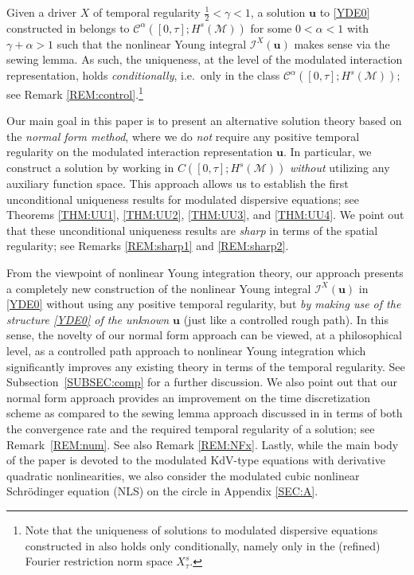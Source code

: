 \documentclass[letterpaper, 11pt,  reqno]{amsart}
\newcommand{\1}{\hspace{0.5mm}\text{I}\hspace{0.5mm}}
\newcommand{\I}{\mathcal{I}}
\newcommand{\CC}{\mathcal{C}}
\newcommand{\al}{\alpha}
\newcommand{\g}{\gamma}
\newcommand{\M}{\mathcal{M}}
\newcommand{\uu}{\mathbf{u}}
\numberwithin{equation}{section}
\numberwithin{theorem}{section}
\begin{document}
Given a driver $X$ of temporal regularity $\frac 12 < \g < 1$, 
a solution $\uu$ to \eqref{YDE0} constructed in \cite{CG1, CGLLO1}
belongs to $\CC^\al([0, \tau] ; H^s(\M))$
for some $0 < \al < 1$ with $\g + \al > 1$
such that the nonlinear Young integral $\I^X(\uu)$
makes sense via the sewing lemma.
As such, 
 the uniqueness, at the level of the modulated interaction representation,  holds 
 {\it conditionally}, i.e.~only  in the class 
 $\CC^\al([0, \tau]; H^s(\M))$;
 see Remark \ref{REM:control}.\footnote{\label{FT:3}Note that the uniqueness
 of solutions to modulated dispersive equations
 constructed 
in \cite{Robert2, Robert3, Robert4}
also holds only conditionally, 
namely only in 
 the  (refined) Fourier restriction norm space $X^s_\tau $.}
 




Our main goal in this paper is to present
an alternative solution theory based
on the {\it normal form method}, 
where we do {\it not} require any positive  temporal regularity on
the modulated interaction representation $\uu$.
In particular, we construct a solution 
by working  in $C([0, \tau]; H^s(\M))$
{\it without} utilizing any auxiliary function space.
This approach allows us to 
establish 
the first unconditional uniqueness results
for  modulated dispersive equations;
see Theorems \ref{THM:UU1}, \ref{THM:UU2},  \ref{THM:UU3}, 
and \ref{THM:UU4}.
We point out that 
these unconditional uniqueness results
are {\it sharp} in terms of the spatial regularity;
see Remarks \ref{REM:sharp1} and \ref{REM:sharp2}.


From the viewpoint of nonlinear Young integration theory, 
our approach 
presents a completely new construction 
of the nonlinear Young integral $\I^X(\uu)$
in \eqref{YDE0}
 without using any positive temporal regularity, 
but {\it by making use of 
the structure \eqref{YDE0}
of the unknown $\uu$}
(just like a controlled rough path).
In this sense, the novelty of 
our normal form approach
can be viewed,  
at a philosophical level, 
as 
a controlled path approach
to nonlinear Young integration
which 
significantly improves any existing theory
in terms of the temporal regularity.
See Subsection~\ref{SUBSEC:comp}
for a further discussion.
We also point out that our
normal form approach
provides an improvement on  
 the time discretization scheme
as compared to  the sewing lemma approach 
discussed in  \cite[Subsection~2.3]{CG1}
in terms of both the convergence rate and 
the required temporal regularity of a solution;
see
Remark~\ref{REM:num}.
See also Remark \ref{REM:NFx}.
Lastly, while the main body of the paper is devoted
to the modulated KdV-type 
equations with derivative quadratic nonlinearities, 
we also consider 
the modulated cubic nonlinear Schr\"odinger equation (NLS)
on the circle
in Appendix \ref{SEC:A}.
\end{document}
